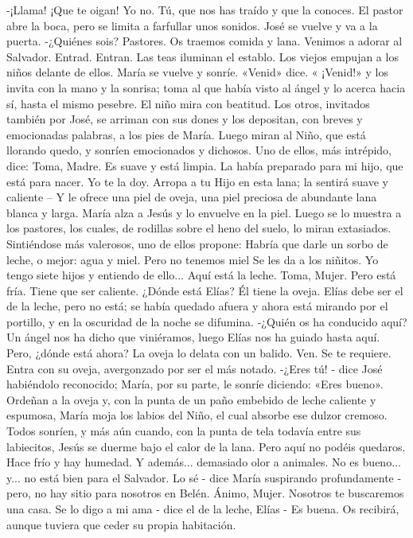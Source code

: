 \documentclass[12pt]{book} %
\begin{document}
-¡Llama! ¡Que te oigan! 
Yo no. Tú, que nos has traído y que la conoces. 
El pastor abre la boca, pero se limita a farfullar unos sonidos. José se vuelve y va a la puerta. 
-¿Quiénes sois? 
Pastores. Os traemos comida y lana. Venimos a adorar al Salvador. 
Entrad. 
Entran. Las teas iluminan el establo. Los viejos empujan a los niños delante de ellos. 
María se vuelve y sonríe. «Venid» dice. « ¡Venid!» y los invita con la mano y la sonrisa; toma al que había visto al ángel y 
lo acerca hacia sí, hasta el mismo pesebre. El niño mira con beatitud. 
Los otros, invitados también por José, se arriman con sus dones y los depositan, con breves y emocionadas palabras, a 
los pies de María. Luego miran al Niño, que está llorando quedo, y sonríen emocionados y dichosos. 
Uno de ellos, más intrépido, dice: 
Toma, Madre. Es suave y está limpia. La había preparado para mi hijo, que está para nacer. Yo te la doy. Arropa a tu 
Hijo en esta lana; la sentirá suave y caliente – Y le ofrece una piel de oveja, una piel preciosa de abundante lana blanca y larga.           
María alza a Jesús y lo envuelve en la piel. Luego se lo muestra a los pastores, los cuales, de rodillas sobre el heno del 
suelo, lo miran extasiados. 
Sintiéndose más valerosos, uno de ellos propone: 
Habría que darle un sorbo de leche, o mejor: agua y miel. Pero no tenemos miel Se les da a los niñitos. Yo tengo siete 
hijos y entiendo de ello... 
Aquí está la leche. Toma, Mujer. 
Pero está fría. Tiene que ser caliente. ¿Dónde está Elías? Él tiene la oveja. 
Elías debe ser el de la leche, pero no está; se había quedado afuera y ahora está mirando por el portillo, y en la 
oscuridad de la noche  se difumina. 
-¿Quién os ha conducido aquí? 
Un ángel nos ha dicho que viniéramos, luego Elías nos ha guiado hasta aquí. Pero, ¿dónde está ahora? La oveja lo delata con un balido. 
Ven. Se te requiere. 
Entra con su oveja, avergonzado por ser el más notado. 
-¿Eres tú! - dice José habiéndolo reconocido; María, por su parte, le sonríe diciendo: «Eres bueno». 
Ordeñan a la oveja y, con la punta de un paño embebido de leche caliente y espumosa, María moja los labios del Niño, 
el cual absorbe ese dulzor cremoso. Todos sonríen, y más aún cuando, con la punta de tela todavía entre sus labiecitos, Jesús se duerme bajo el calor de la lana. 
Pero aquí no podéis quedaros. Hace frío y hay humedad. Y además... demasiado olor a animales. No es bueno... y... no 
está bien para el Salvador. 
Lo sé - dice María suspirando profundamente - pero, no hay sitio para nosotros en Belén. 
Ánimo, Mujer. Nosotros te buscaremos una casa. 
Se lo digo a mi ama - dice el de la leche, Elías - Es buena. Os recibirá, aunque tuviera que ceder su propia habitación. 
\end{document}
